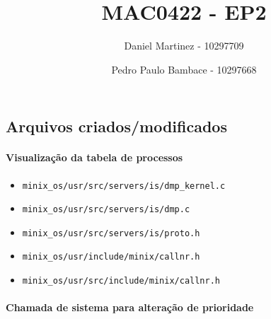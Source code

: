 \documentclass[]{article}
\title{\textbf{MAC0422 - EP2}}
\author{Daniel Martinez - 10297709 
  \and Pedro Paulo Bambace - 10297668}
\date{}
\providecommand{\tightlist}{%
  \setlength{\itemsep}{0pt}\setlength{\parskip}{0pt}}
\let\oldparagraph\paragraph
\renewcommand{\paragraph}[1]{\oldparagraph{#1}\mbox{}}
\begin{document}
\maketitle

\hypertarget{arquivos-criadosmodificados}{%
\subsection{Arquivos
criados/modificados}\label{arquivos-criadosmodificados}}

\hypertarget{visualizauxe7uxe3o-da-tabela-de-processos}{%
\paragraph{Visualização da tabela de
processos}}

\begin{itemize}
\tightlist
\item
  \texttt{minix\_os/usr/src/servers/is/dmp\_kernel.c}
\item
  \texttt{minix\_os/usr/src/servers/is/dmp.c}
\item
  \texttt{minix\_os/usr/src/servers/is/proto.h}
\item
  \texttt{minix\_os/usr/include/minix/callnr.h}
\item
  \texttt{minix\_os/usr/src/include/minix/callnr.h}
\end{itemize}

\hypertarget{chamada-de-sistema-para-alterauxe7uxe3o-de-prioridade}{%
\paragraph{Chamada de sistema para alteração de
prioridade}}
\end{document}
